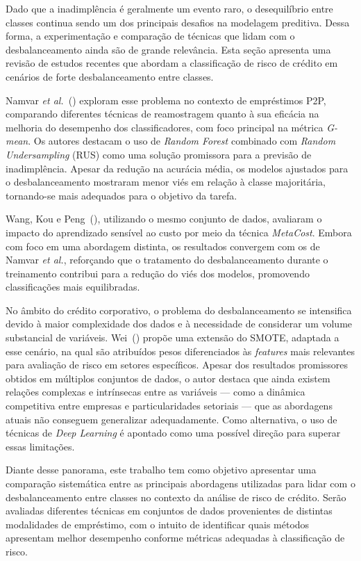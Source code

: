 Dado que a inadimplência é geralmente um evento raro, o desequilíbrio entre classes continua sendo um dos principais desafios na modelagem preditiva. Dessa forma, a experimentação e comparação de técnicas que lidam com o desbalanceamento ainda são de grande relevância. Esta seção apresenta uma revisão de estudos recentes que abordam a classificação de risco de crédito em cenários de forte desbalanceamento entre classes.

Namvar \textit{et al.}~(\citeyear{Namvar2018}) exploram esse problema no contexto de empréstimos P2P, comparando diferentes técnicas de reamostragem quanto à sua eficácia na melhoria do desempenho dos classificadores, com foco principal na métrica \textit{G-mean}. Os autores destacam o uso de \textit{Random Forest} combinado com \textit{Random Undersampling} (RUS) como uma solução promissora para a previsão de inadimplência. Apesar da redução na acurácia média, os modelos ajustados para o desbalanceamento mostraram menor viés em relação à classe majoritária, tornando-se mais adequados para o objetivo da tarefa.

Wang, Kou e Peng~(\citeyear{Namvar2018}), utilizando o mesmo conjunto de dados, avaliaram o impacto do aprendizado sensível ao custo por meio da técnica \textit{MetaCost}. Embora com foco em uma abordagem distinta, os resultados convergem com os de Namvar \textit{et al.}, reforçando que o tratamento do desbalanceamento durante o treinamento contribui para a redução do viés dos modelos, promovendo classificações mais equilibradas.

No âmbito do crédito corporativo, o problema do desbalanceamento se intensifica devido à maior complexidade dos dados e à necessidade de considerar um volume substancial de variáveis. Wei~(\citeyear{Wei2025}) propõe uma extensão do SMOTE, adaptada a esse cenário, na qual são atribuídos pesos diferenciados às \textit{features} mais relevantes para avaliação de risco em setores específicos. Apesar dos resultados promissores obtidos em múltiplos conjuntos de dados, o autor destaca que ainda existem relações complexas e intrínsecas entre as variáveis — como a dinâmica competitiva entre empresas e particularidades setoriais — que as abordagens atuais não conseguem generalizar adequadamente. Como alternativa, o uso de técnicas de \textit{Deep Learning} é apontado como uma possível direção para superar essas limitações.

Diante desse panorama, este trabalho tem como objetivo apresentar uma comparação sistemática entre as principais abordagens utilizadas para lidar com o desbalanceamento entre classes no contexto da análise de risco de crédito. Serão avaliadas diferentes técnicas em conjuntos de dados provenientes de distintas modalidades de empréstimo, com o intuito de identificar quais métodos apresentam melhor desempenho conforme métricas adequadas à classificação de risco.
